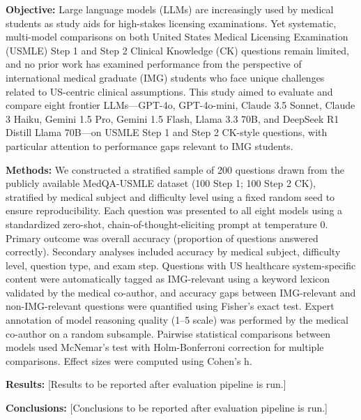 \textbf{Objective:}
Large language models (LLMs) are increasingly used by medical students as study aids for high-stakes licensing examinations. Yet systematic, multi-model comparisons on both United States Medical Licensing Examination (USMLE) Step 1 and Step 2 Clinical Knowledge (CK) questions remain limited, and no prior work has examined performance from the perspective of international medical graduate (IMG) students who face unique challenges related to US-centric clinical assumptions. This study aimed to evaluate and compare eight frontier LLMs—GPT-4o, GPT-4o-mini, Claude 3.5 Sonnet, Claude 3 Haiku, Gemini 1.5 Pro, Gemini 1.5 Flash, Llama 3.3 70B, and DeepSeek R1 Distill Llama 70B—on USMLE Step 1 and Step 2 CK-style questions, with particular attention to performance gaps relevant to IMG students.

\textbf{Methods:}
We constructed a stratified sample of 200 questions drawn from the publicly available MedQA-USMLE dataset (100 Step 1; 100 Step 2 CK), stratified by medical subject and difficulty level using a fixed random seed to ensure reproducibility. Each question was presented to all eight models using a standardized zero-shot, chain-of-thought-eliciting prompt at temperature 0. Primary outcome was overall accuracy (proportion of questions answered correctly). Secondary analyses included accuracy by medical subject, difficulty level, question type, and exam step. Questions with US healthcare system-specific content were automatically tagged as IMG-relevant using a keyword lexicon validated by the medical co-author, and accuracy gaps between IMG-relevant and non-IMG-relevant questions were quantified using Fisher's exact test. Expert annotation of model reasoning quality (1–5 scale) was performed by the medical co-author on a random subsample. Pairwise statistical comparisons between models used McNemar's test with Holm-Bonferroni correction for multiple comparisons. Effect sizes were computed using Cohen's h.

\textbf{Results:}
[Results to be reported after evaluation pipeline is run.]

\textbf{Conclusions:}
[Conclusions to be reported after evaluation pipeline is run.]
